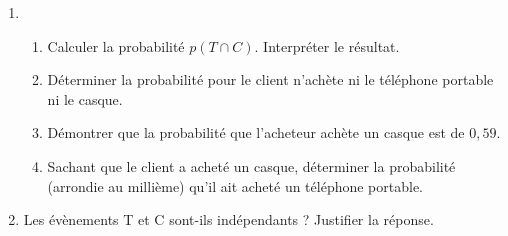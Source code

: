 \documentclass[a4paper,11pt]{article}
\begin{document}
\begin{enumerate}
	\item
	\begin{enumerate}
		\item Calculer la probabilité $p(T \cap C)$. Interpréter le résultat.
		\item Déterminer la probabilité pour le client n'achète ni le téléphone portable ni le casque.
		\item Démontrer que la probabilité que l'acheteur achète un casque est de $0,59$.
		\item Sachant que le client a acheté un casque, déterminer la probabilité (arrondie au millième) qu'il ait acheté un téléphone portable.
	\end{enumerate}
	\item Les évènements T et C sont-ils indépendants ? Justifier la réponse.
\end{enumerate}
\end{document}

